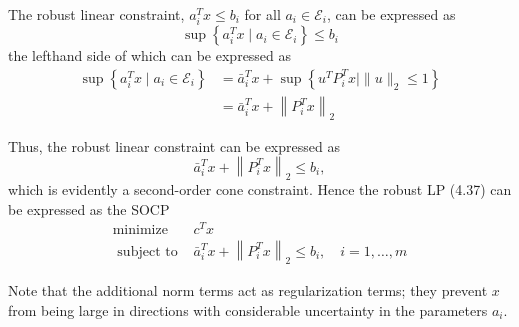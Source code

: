 The robust linear constraint, $a_i^T x \leq b_i$ for all $a_i \in \mathcal{E}_i$, can be expressed as
$$
\sup \left\{a_i^T x \mid a_i \in \mathcal{E}_i\right\} \leq b_i
$$
the lefthand side of which can be expressed as
$$
\begin{aligned}
\sup \left\{a_i^T x \mid a_i \in \mathcal{E}_i\right\} & =\bar{a}_i^T x+\sup \left\{u^T P_i^T x \mid\|u\|_2 \leq 1\right\} \\
& =\bar{a}_i^T x+\left\|P_i^T x\right\|_2
\end{aligned}
$$

Thus, the robust linear constraint can be expressed as
$$
\bar{a}_i^T x+\left\|P_i^T x\right\|_2 \leq b_i,
$$
which is evidently a second-order cone constraint. Hence the robust LP (4.37) can be expressed as the SOCP
$$
\begin{array}{ll}
\operatorname{minimize} & c^T x \\
\text { subject to } & \bar{a}_i^T x+\left\|P_i^T x\right\|_2 \leq b_i, \quad i=1, \ldots, m
\end{array}
$$

Note that the additional norm terms act as regularization terms; they prevent $x$ from being large in directions with considerable uncertainty in the parameters $a_i$.



